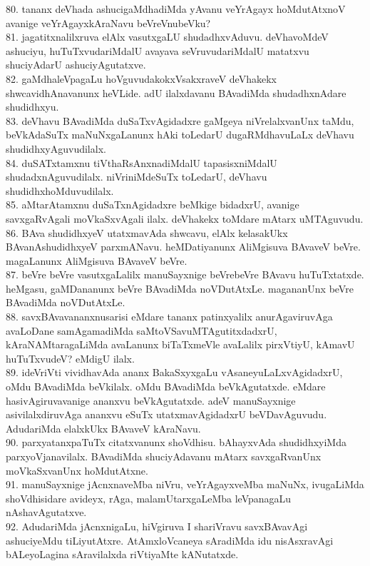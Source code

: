 \documentclass{article}
\begin{document}
80. tananx deVhada ashucigaMdhadiMda yAvanu veYrAgayx hoMdutAtxnoV avanige veYrAgayxkAraNavu beVreVnubeVku?\\
81. jagatitxnalilxruva elAlx vasutxgaLU shudadhxvAduvu. deVhavoMdeV ashuciyu, huTuTxvudariMdalU avayava seVruvudariMdalU matatxvu shuciyAdarU ashuciyAgutatxve.\\
82. gaMdhaleVpagaLu hoVguvudakokxVsakxraveV deVhakekx shwcavidhAnavanunx heVLide. adU ilalxdavanu BAvadiMda shudadhxnAdare shudidhxyu.\\
83. deVhavu BAvadiMda duSaTxvAgidadxre gaMgeya niVrelalxvanUnx taMdu, beVkAdaSuTx maNuNxgaLanunx hAki toLedarU dugaRMdhavuLaLx deVhavu shudidhxyAguvudilalx.\\
84. duSATxtamxnu tiVthaRsAnxnadiMdalU tapasisxniMdalU shudadxnAguvudilalx. niVriniMdeSuTx toLedarU, deVhavu shudidhxhoMduvudilalx.\\
85. aMtarAtamxnu duSaTxnAgidadxre beMkige bidadxrU, avanige savxgaRvAgali moVkaSxvAgali ilalx. deVhakekx toMdare mAtarx uMTAguvudu.\\
86. BAva shudidhxyeV utatxmavAda shwcavu, elAlx kelasakUkx BAvanAshudidhxyeV parxmANavu. heMDatiyanunx AliMgisuva BAvaveV beVre. magaLanunx AliMgisuva BAvaveV beVre.\\
87. beVre beVre vasutxgaLalilx manuSayxnige beVrebeVre BAvavu huTuTxtatxde. heMgasu, gaMDananunx beVre BAvadiMda noVDutAtxLe. magananUnx beVre BAvadiMda noVDutAtxLe.\\
88. savxBAvavananxnusarisi eMdare tananx patinxyalilx anurAgaviruvAga avaLoDane samAgamadiMda saMtoVSavuMTAgutitxdadxrU, kAraNAMtaragaLiMda avaLanunx biTaTxmeVle avaLalilx pirxVtiyU, kAmavU huTuTxvudeV? eMdigU ilalx.\\
89. ideVriVti vividhavAda ananx BakaSxyxgaLu vAsaneyuLaLxvAgidadxrU, oMdu BAvadiMda beVkilalx. oMdu BAvadiMda beVkAgutatxde. eMdare hasivAgiruvavanige ananxvu beVkAgutatxde. adeV manuSayxnige asivilalxdiruvAga ananxvu eSuTx utatxmavAgidadxrU beVDavAguvudu. AdudariMda elalxkUkx BAvaveV kAraNavu.\\
90. parxyatanxpaTuTx citatxvanunx shoVdhisu. bAhayxvAda shudidhxyiMda parxyoVjanavilalx. BAvadiMda shuciyAdavanu mAtarx savxgaRvanUnx moVkaSxvanUnx hoMdutAtxne.\\
91. manuSayxnige jAcnxnaveMba niVru, veYrAgayxveMba maNuNx, ivugaLiMda shoVdhisidare avideyx, rAga, malamUtarxgaLeMba leVpanagaLu nAshavAgutatxve.\\
92. AdudariMda jAcnxnigaLu, hiVgiruva I shariVravu savxBAvavAgi ashuciyeMdu tiLiyutAtxre. AtAmxloVcaneya sAradiMda idu nisAsxravAgi bALeyoLagina sAravilalxda riVtiyaMte kANutatxde.\\
\end{document}
